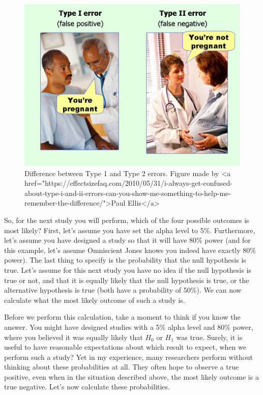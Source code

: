 \documentclass[
  oneside]{book}
\begin{document}
\begin{figure}

{\centering \includegraphics[width=1\linewidth]{images/type1type2error} 

}

\caption{Difference between Type 1 and Type 2 errors. Figure made by <a href="https://effectsizefaq.com/2010/05/31/i-always-get-confused-about-type-i-and-ii-errors-can-you-show-me-something-to-help-me-remember-the-difference/">Paul Ellis</a>}\label{fig:errortypes}
\end{figure}

So, for the next study you will perform, which of the four possible outcomes is most likely? First, let's assume you have set the alpha level to 5\%. Furthermore, let's assume you have designed a study so that it will have 80\% power (and for this example, let's assume Omniscient Jones knows you indeed have exactly 80\% power). The last thing to specify is the probability that the null hypothesis is true. Let's assume for this next study you have no idea if the null hypothesis is true or not, and that it is equally likely that the null hypothesis is true, or the alternative hypothesis is true (both have a probability of 50\%). We can now calculate what the most likely outcome of such a study is.

Before we perform this calculation, take a moment to think if you know the answer. You might have designed studies with a 5\% alpha level and 80\% power, where you believed it was equally likely that \(H_0\) or \(H_1\) was true. Surely, it is useful to have reasonable expectations about which result to expect, when we perform such a study? Yet in my experience, many researchers perform without thinking about these probabilities at all. They often hope to observe a true positive, even when in the situation described above, the most likely outcome is a true negative. Let's now calculate these probabilities.
\end{document}
